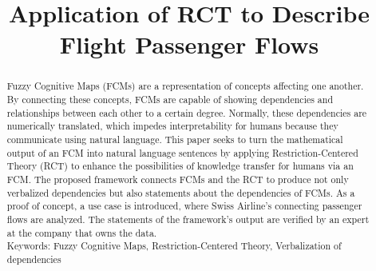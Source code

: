 \documentclass[conference]{IEEEtran}
\begin{document}
\title{Application of RCT to Describe Flight Passenger Flows}

\author{
\and
{}
\and
{}
}

\maketitle

\begin{abstract}
Fuzzy Cognitive Maps (FCMs) are a representation of concepts affecting one another. By connecting these concepts, FCMs are capable of showing dependencies and relationships between each other to a certain degree. Normally, these dependencies are numerically translated, which impedes interpretability for humans because they communicate using natural language. This paper seeks to turn the mathematical output of an FCM into natural language sentences by applying Restriction-Centered Theory (RCT) to enhance the possibilities of knowledge transfer for humans via an FCM. The proposed framework connects FCMs and the RCT to produce not only verbalized dependencies but also statements about the dependencies of FCMs. As a proof of concept, a use case is introduced, where Swiss Airline's connecting passenger flows are analyzed. The statements of the framework's output are verified by an expert at the company that owns the data.\\
Keywords: Fuzzy Cognitive Maps, Restriction-Centered Theory, Verbalization of dependencies
\end{abstract}

	
\IEEEpeerreviewmaketitle
\end{document}
